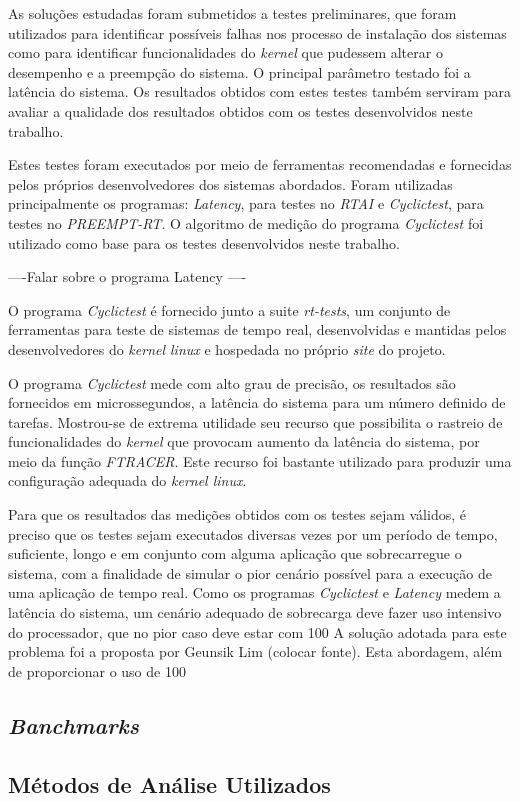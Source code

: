 As soluções estudadas foram submetidos a testes preliminares, que foram utilizados para identificar possíveis falhas nos processo de instalação dos sistemas como para identificar funcionalidades do \textit{kernel} que pudessem alterar o desempenho e a preempção do sistema. O principal parâmetro testado foi a latência do sistema. Os resultados obtidos com estes testes também serviram para avaliar a qualidade dos resultados obtidos com os testes desenvolvidos neste trabalho.

Estes testes foram executados por meio de ferramentas recomendadas e fornecidas pelos próprios desenvolvedores dos sistemas abordados. Foram utilizadas principalmente os programas: \textit{Latency}, para testes no \textit{RTAI} e \textit{Cyclictest}, para testes no \textit{PREEMPT-RT}. O algoritmo de medição do programa \textit{Cyclictest} foi utilizado como base para os testes desenvolvidos neste trabalho.

----Falar sobre o programa Latency ----

O programa \textit{Cyclictest} \cite{FreeSoftware} é fornecido junto a suite \textit{rt-tests}, um conjunto de ferramentas para teste de sistemas de tempo real, desenvolvidas e mantidas pelos desenvolvedores do \textit{kernel linux} e hospedada no próprio \textit{site} do projeto.

O programa \textit{Cyclictest} mede com alto grau de precisão, os resultados são fornecidos em microssegundos, a latência do sistema para um número definido de tarefas. Mostrou-se de extrema utilidade seu recurso que possibilita o rastreio de funcionalidades do \textit{kernel} que provocam aumento da latência do sistema, por meio da função \textit{FTRACER}. Este recurso foi bastante utilizado para produzir uma configuração adequada do \textit{kernel linux}.

Para que os resultados das medições obtidos com os testes sejam válidos, é preciso que os testes sejam executados diversas vezes por um período de tempo, suficiente, longo e em conjunto com alguma aplicação que sobrecarregue o sistema, com a finalidade de simular o pior cenário possível para a execução de uma aplicação de tempo real. Como os programas \textit{Cyclictest} e \textit{Latency} medem a latência do sistema, um cenário adequado de sobrecarga deve fazer uso intensivo do processador, que no pior caso deve estar com 100%
A solução adotada para este problema foi a proposta por Geunsik Lim (colocar fonte). Esta abordagem, além de proporcionar o uso de 100%

\subsection{\textit{Banchmarks}}

\subsection{Métodos de Análise Utilizados}